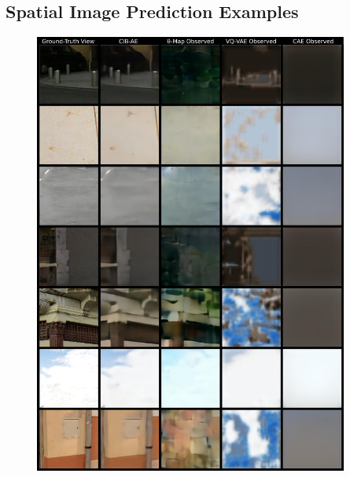 \begin{appendices}
\chapter{Spatial Image Prediction Examples} \label{ch:app_predictions}
\begin{figure}
    \centering
    \includegraphics[width=0.92\textwidth]{figures/ptz/train_stacked_0}
\end{figure}
\begin{figure}
    \centering

\end{figure}
\end{appendices}
